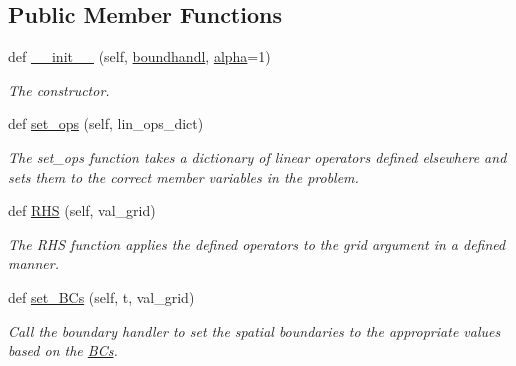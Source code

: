 \subsection*{Public Member Functions}
\begin{DoxyCompactItemize}
\item 
def \hyperlink{classMain__PDE__Repo_1_1src_1_1conduct__heat__eqn_1_1ConductHeatEqn_a633aec4538eca3787158fad099fc325e}{\+\_\+\+\_\+init\+\_\+\+\_\+} (self, \hyperlink{classMain__PDE__Repo_1_1src_1_1conduct__heat__eqn_1_1ConductHeatEqn_ad02498e5299e7a1d34f9f8ef1460fddd}{boundhandl}, \hyperlink{classMain__PDE__Repo_1_1src_1_1conduct__heat__eqn_1_1ConductHeatEqn_abd7a28d699a29f455f2be1c6a8620345}{alpha}=1)
\begin{DoxyCompactList}\small\item\em The constructor. \end{DoxyCompactList}\item 
def \hyperlink{classMain__PDE__Repo_1_1src_1_1conduct__heat__eqn_1_1ConductHeatEqn_a9733763f77bf263a466bb08effec78ab}{set\+\_\+ops} (self, lin\+\_\+ops\+\_\+dict)
\begin{DoxyCompactList}\small\item\em The set\+\_\+ops function takes a dictionary of linear operators defined elsewhere and sets them to the correct member variables in the problem. \end{DoxyCompactList}\item 
def \hyperlink{classMain__PDE__Repo_1_1src_1_1conduct__heat__eqn_1_1ConductHeatEqn_a5889ab024d0a42bf84a00c1c156a19a9}{R\+HS} (self, val\+\_\+grid)
\begin{DoxyCompactList}\small\item\em The R\+HS function applies the defined operators to the grid argument in a defined manner. \end{DoxyCompactList}\item 
def \hyperlink{classMain__PDE__Repo_1_1src_1_1conduct__heat__eqn_1_1ConductHeatEqn_ac8c71907fe7365902668c6785130c522}{set\+\_\+\+B\+Cs} (self, t, val\+\_\+grid)
\begin{DoxyCompactList}\small\item\em Call the boundary handler to set the spatial boundaries to the appropriate values based on the \hyperlink{namespaceMain__PDE__Repo_1_1src_1_1BCs}{B\+Cs}. \end{DoxyCompactList}\end{DoxyCompactItemize}
